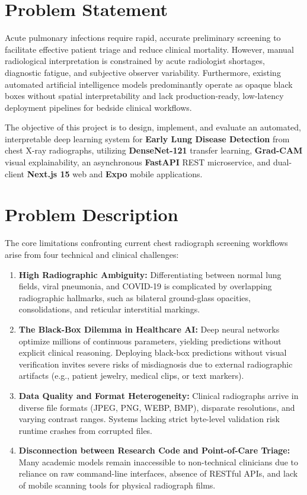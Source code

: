 \documentclass[12pt,a4paper]{report}
\begin{document}
\section{Problem Statement}
Acute pulmonary infections require rapid, accurate preliminary screening to facilitate effective patient triage and reduce clinical mortality. However, manual radiological interpretation is constrained by acute radiologist shortages, diagnostic fatigue, and subjective observer variability. Furthermore, existing automated artificial intelligence models predominantly operate as opaque black boxes without spatial interpretability and lack production-ready, low-latency deployment pipelines for bedside clinical workflows.

The objective of this project is to design, implement, and evaluate an automated, interpretable deep learning system for \textbf{Early Lung Disease Detection} from chest X-ray radiographs, utilizing \textbf{DenseNet-121} transfer learning, \textbf{Grad-CAM} visual explainability, an asynchronous \textbf{FastAPI} REST microservice, and dual-client \textbf{Next.js 15} web and \textbf{Expo} mobile applications.

\section{Problem Description}
The core limitations confronting current chest radiograph screening workflows arise from four technical and clinical challenges:
\begin{enumerate}
    \item \textbf{High Radiographic Ambiguity:} Differentiating between normal lung fields, viral pneumonia, and COVID-19 is complicated by overlapping radiographic hallmarks, such as bilateral ground-glass opacities, consolidations, and reticular interstitial markings.
    \item \textbf{The Black-Box Dilemma in Healthcare AI:} Deep neural networks optimize millions of continuous parameters, yielding predictions without explicit clinical reasoning. Deploying black-box predictions without visual verification invites severe risks of misdiagnosis due to external radiographic artifacts (e.g., patient jewelry, medical clips, or text markers).
    \item \textbf{Data Quality and Format Heterogeneity:} Clinical radiographs arrive in diverse file formats (JPEG, PNG, WEBP, BMP), disparate resolutions, and varying contrast ranges. Systems lacking strict byte-level validation risk runtime crashes from corrupted files.
    \item \textbf{Disconnection between Research Code and Point-of-Care Triage:} Many academic models remain inaccessible to non-technical clinicians due to reliance on raw command-line interfaces, absence of RESTful APIs, and lack of mobile scanning tools for physical radiograph films.
\end{enumerate}
\end{document}
